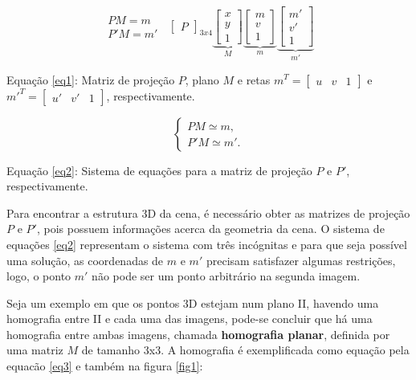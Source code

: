 \begin{equation}\label{eq1}
\begin{aligned}
	PM = m \\
	P'M = m'
\end{aligned} \; \;
\begin{bmatrix}
		P
\end{bmatrix}_{3x4}	
\underbrace{\begin{bmatrix}
		x \\ y \\ 1
\end{bmatrix}
}_{M}
\underbrace{\begin{bmatrix}
		m\\v\\1
\end{bmatrix}}_{m}	
\underbrace{\begin{bmatrix}
		m'\\v'\\1
	\end{bmatrix}}_{m'}
\end{equation}
 

Equação \eqref{eq1}: Matriz de projeção $P$, plano $M$ e retas $m^T = \begin{bmatrix}u & v & 1\end{bmatrix}$ e $m'^T = \begin{bmatrix}u' & v' & 1\end{bmatrix}$, respectivamente.

\begin{equation}\label{eq2}
\begin{cases}
P M \simeq m, \\
P' M \simeq m'.
\end{cases}
\end{equation}

Equação \eqref{eq2}: Sistema de equações para a matriz de projeção $P$ e $P'$, respectivamente.

Para encontrar a estrutura 3D da cena, é necessário obter as matrizes de projeção $P$ e $P'$, pois possuem informações acerca da geometria da cena. O sistema de equações \eqref{eq2} representam o sistema com três incógnitas e para que seja possível uma solução, as coordenadas de $m$ e $m'$ precisam satisfazer algumas restrições, logo, o ponto $m'$ não pode ser um ponto arbitrário na segunda imagem.

Seja um exemplo em que os pontos 3D estejam num plano II, havendo uma homografia \cite{Faugeras-Geometry} entre II e cada uma das imagens, pode-se concluir que há uma homografia entre ambas imagens, chamada \textbf{homografia planar}, definida por uma matriz $M$ de tamanho 3x3. A homografia é exemplificada como equação pela equacão \eqref{eq3} e também na figura \ref{fig1}:

